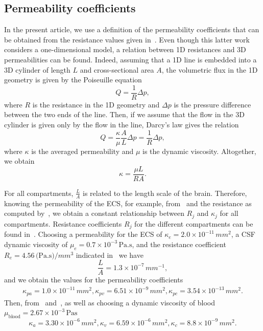 \documentclass[a4paper,11pt]{article}
\newcommand{\1}{^{(1)}}
\newcommand{\2}{^{(2)}}
\begin{document}
\subsection{Permeability coefficients}

In the present article, we use a definition of the permeability coefficients that can be obtained from the resistance values given in~\cite{Vinje-2020-ICP}. Even though this latter work considers a one-dimensional model, a relation between 1D resistances and 3D permeabilities can be found. 
Indeed, assuming that a 1D line is embedded into a 3D cylinder of length $L$ and cross-sectional area $A$, the volumetric flux in the 1D geometry is given by the Poiseuille equation
\[
    Q = \frac{1}{R} \Delta p,
\]
where $R$ is the resistance in the 1D geometry and $\Delta p$ is the pressure difference between the two ends of the line.
Then, if we assume that the flow in the 3D cylinder is given only by the flow in the line, Darcy's law gives the relation 
\[
    Q = \frac{\kappa}{\mu} \frac{A}{L} \Delta p  = \frac{1}{R} \Delta p,
\]
where $\kappa$ is the averaged permeability and $\mu$ is the dynamic viscosity. 
Altogether, we obtain 
\begin{equation}
\kappa = \frac{\mu L}{R A}.
\label{eq:relation-resistance-permeability}
\end{equation}

For all compartments,  $\frac{L}{A}$ is related to the length scale of the brain. 
Therefore, knowing the permeability of the ECS, for example, from~\cite{Holter9894} and the resistance as computed by~\cite{Vinje-2020-ICP}, we obtain a constant relationship between $R_j$ and $\kappa_j$ for all compartments. 
Resistance coefficients $R_j$ for the different compartments can be found in~\cite{Vinje-2020-ICP}.
Choosing a permeability for the ECS of $\kappa_e = 2.0\times 10^{-11}\,\si{mm^2}$, a CSF dynamic viscosity of $\mu_e = 0.7\times 10^{-3}\, \si{\pascal.\second}$, and the resistance coefficient $R_e = 4.56 \,\si{(\pascal.\second)\per mm^3} $ indicated in~\cite{Vinje-2020-ICP} we have 
\[
    \frac{L}{A} = 1.3 \times 10^{-7}\, \si{mm^{-1}},
\]
and we obtain the values for the permeability coefficients
\[
\begin{aligned}
\kappa_{pa} = 1.0 \times 10^{-11}\,\si{mm^2}, \kappa_{pv} = 6.51\times 10^{-9}\,\si{mm^2}, \kappa_{pc} = 3.54\times 10^{-13}\,\si{mm^2}. 
\end{aligned}
\]
Then, from~\cite{el2015multi} and~\cite{jozsa2021porous}, as well as choosing a dynamic viscosity of blood $\mu_\text{blood} = 2.67 \times 10^{-3} \,\si{\pascal\second}$~\cite{tully_ventikos_2011}
\[
\kappa_a =  3.30 \times 10^{-6}\,\si{mm^2}, \kappa_v =6.59 \times 10^{-6}\,\si{mm^2}, \kappa_c = 8.8 \times 10^{-9}\,\si{mm^2}.
\]
\end{document}
